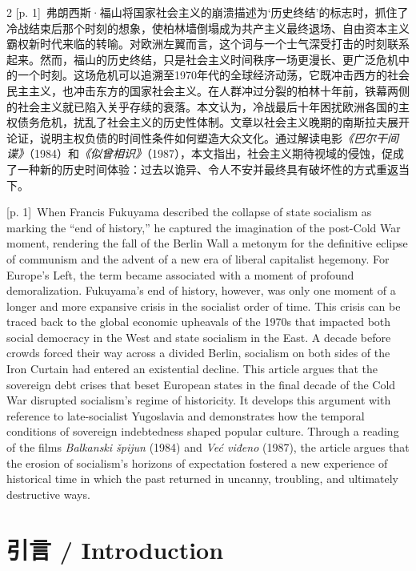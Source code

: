 \documentclass[10pt,a4paper]{article}
\begin{document}
\begin{paracol}{2}
{\scriptsize\color{gray} [p. 1]}\ 弗朗西斯·福山将国家社会主义的崩溃描述为‘历史终结’的标志时，抓住了冷战结束后那个时刻的想象，使柏林墙倒塌成为共产主义最终退场、自由资本主义霸权新时代来临的转喻。对欧洲左翼而言，这个词与一个士气深受打击的时刻联系起来。然而，福山的历史终结，只是社会主义时间秩序一场更漫长、更广泛危机中的一个时刻。这场危机可以追溯至1970年代的全球经济动荡，它既冲击西方的社会民主主义，也冲击东方的国家社会主义。在人群冲过分裂的柏林十年前，铁幕两侧的社会主义就已陷入关乎存续的衰落。本文认为，冷战最后十年困扰欧洲各国的主权债务危机，扰乱了社会主义的历史性体制。文章以社会主义晚期的南斯拉夫展开论证，说明主权负债的时间性条件如何塑造大众文化。通过解读电影\textit{《巴尔干间谍》}（1984）和\textit{《似曾相识》}（1987），本文指出，社会主义期待视域的侵蚀，促成了一种新的历史时间体验：过去以诡异、令人不安并最终具有破坏性的方式重返当下。\par
\switchcolumn
{\scriptsize\color{gray} [p. 1]}\ When Francis Fukuyama described the collapse of state socialism as marking the “end of history,” he captured the imagination of the post-Cold War moment, rendering the fall of the Berlin Wall a metonym for the definitive eclipse of communism and the advent of a new era of liberal capitalist hegemony. For Europe’s Left, the term became associated with a moment of profound demoralization. Fukuyama’s end of history, however, was only one moment of a longer and more expansive crisis in the socialist order of time. This crisis can be traced back to the global economic upheavals of the 1970s that impacted both social democracy in the West and state socialism in the East. A decade before crowds forced their way across a divided Berlin, socialism on both sides of the Iron Curtain had entered an existential decline. This article argues that the sovereign debt crises that beset European states in the final decade of the Cold War disrupted socialism’s regime of historicity. It develops this argument with reference to late-socialist Yugoslavia and demonstrates how the temporal conditions of sovereign indebtedness shaped popular culture. Through a reading of the films \textit{Balkanski špijun} (1984) and \textit{Već viđeno} (1987), the article argues that the erosion of socialism’s horizons of expectation fostered a new experience of historical time in which the past returned in uncanny, troubling, and ultimately destructive ways.\par
\switchcolumn*
\end{paracol}
\section*{引言 / Introduction}
\end{document}

